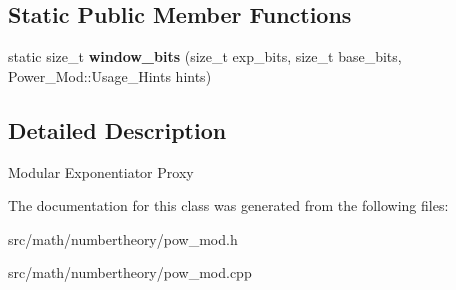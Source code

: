 \subsection*{Static Public Member Functions}
\begin{DoxyCompactItemize}
\item 
\hypertarget{classBotan_1_1Power__Mod_aba7ee342bfa28f18cdcca4d831c4c31b}{static size\-\_\-t {\bfseries window\-\_\-bits} (size\-\_\-t exp\-\_\-bits, size\-\_\-t base\-\_\-bits, Power\-\_\-\-Mod\-::\-Usage\-\_\-\-Hints hints)}\label{classBotan_1_1Power__Mod_aba7ee342bfa28f18cdcca4d831c4c31b}

\end{DoxyCompactItemize}


\subsection{Detailed Description}
Modular Exponentiator Proxy 

The documentation for this class was generated from the following files\-:\begin{DoxyCompactItemize}
\item 
src/math/numbertheory/pow\-\_\-mod.\-h\item 
src/math/numbertheory/pow\-\_\-mod.\-cpp\end{DoxyCompactItemize}
